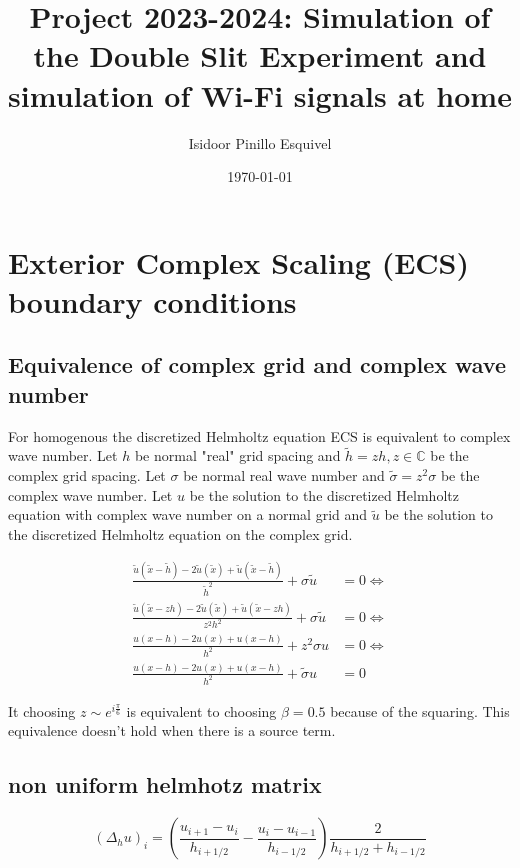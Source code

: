 \documentclass[a4paper,12pt]{article}
\begin{document}
\title{Project 2023-2024: Simulation of the Double Slit Experiment
    and simulation of Wi-Fi signals at home}
\author{Isidoor Pinillo Esquivel}
\date{\today}
\maketitle


\section{Exterior Complex Scaling (ECS) boundary conditions}
\subsection{Equivalence of complex grid and complex wave number}

For homogenous the discretized Helmholtz equation ECS is equivalent to
complex wave number. Let $h$ be normal "real" grid spacing and $\tilde{h} = z h, z \in \mathbb{C} $
be the complex grid spacing.
Let $\sigma$ be normal real wave number and $\tilde{\sigma} = z^{2} \sigma$ be the complex wave number.
Let $u$ be the solution to the discretized Helmholtz equation with complex wave number on a normal grid
and $\tilde{u}$ be the solution to the discretized Helmholtz equation on the complex grid.

\begin{align}
    \frac{\tilde{u}(\tilde{x}-\tilde{h}) -2 \tilde{u}(\tilde{x}) + \tilde{u}(\tilde{x} - \tilde{h})}{\tilde{h}^2} + \sigma \tilde{u} & = 0  \Leftrightarrow \\
    \frac{\tilde{u}(\tilde{x}-zh) -2 \tilde{u}(\tilde{x}) + \tilde{u}(\tilde{x} - zh)}{z^{2}h^2} + \sigma \tilde{u}                  & = 0  \Leftrightarrow \\
    \frac{u(x-h) -2 u(x) + u(x - h)}{h^2} + z^{2} \sigma u                                                                           & = 0  \Leftrightarrow \\
    \frac{u(x-h) -2 u(x) + u(x - h)}{h^2} + \tilde{\sigma} u                                                                         & = 0
\end{align}

It choosing $z \sim e^{i \frac{\pi}{6} }$ is equivalent to choosing $\beta = 0.5$ because of the squaring.
This equivalence doesn't hold when there is a source term.
\subsection{ non uniform helmhotz matrix}

$$
    (\Delta_{h}u)_{i} = \left( \frac{u_{i+1} - u_{i}}{h_{i+1/2}} - \frac{u_{i} - u_{i-1}}{h_{i-1/2}} \right) \frac{2}{h_{i+1/2} +h_{i-1/2}}
$$
\end{document}
